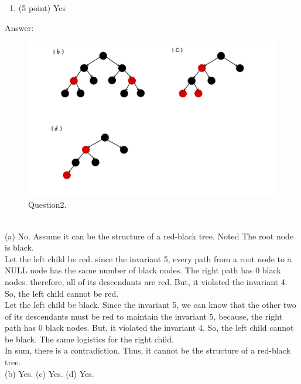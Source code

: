 \documentclass[12pt]{article}
\begin{document}
\begin{enumerate}
\begin{multicols}{2}
\begin{enumerate}
        \item (5 point) Yes

       \end{enumerate}

      
    \end{multicols}
       {\color{blue}Answer:
         \begin{figure}[h]
  	\centering
  	\includegraphics*[scale=0.2]{Question2-2.jpg}
	\caption{Question2.}
	\label{fig:example}
  \end{figure}
  
       \\(a)  No. Assume it can be the structure of a red-black tree. Noted The root node is black.
        \\Let the left child be red. since the invariant 5, every path from a root node to a NULL node has the same number of black nodes. The right path has 0 black nodes. therefore, all of its descendants are red. But, it violated the invariant 4. So, the left child cannot be red.
        \\Let the left child be black. Since the invariant 5, we can know that the other two of its descendants must be red to maintain the invariant 5, because, the right path has 0 black nodes. But, it violated the invariant 4. So, the left child cannot be black. The same logistics for the right child.
        \\In sum, there is a contradiction. Thus,  it cannot be the structure of a red-black tree.
        \\(b) Yes. (c) Yes. (d) Yes.
        
}
\end{enumerate}
\end{document}
